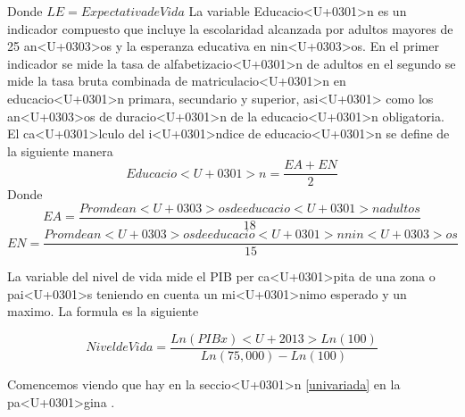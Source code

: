 \documentclass{article}
\begin{document}
Donde $LE = Expectativa de Vida$
La variable Educacio<U+0301>n es un indicador compuesto que incluye la escolaridad alcanzada por adultos mayores de 25 an<U+0303>os y la esperanza educativa en nin<U+0303>os. En el primer indicador se mide la tasa de alfabetizacio<U+0301>n de adultos en el segundo se mide la tasa bruta combinada de matriculacio<U+0301>n en educacio<U+0301>n primara, secundario y superior, asi<U+0301> como los an<U+0303>os de duracio<U+0301>n de la educacio<U+0301>n obligatoria. El ca<U+0301>lculo del i<U+0301>ndice de educacio<U+0301>n se define de la siguiente manera
\[Educacio<U+0301>n= \frac{EA + EN} {2} \]
Donde
\[EA= \frac{Prom de an<U+0303>os de educacio<U+0301>n adultos} {18}  \]
\[EN= \frac{Prom de an<U+0303>os de educacio<U+0301>n nin<U+0303>os} {15}  \]

La variable del nivel de vida mide el PIB per ca<U+0301>pita de una zona o pai<U+0301>s teniendo en cuenta un mi<U+0301>nimo esperado y un maximo. La formula es la siguiente

\[Nivel de Vida = \frac {Ln(PIBx) <U+2013> Ln (100)} {Ln(75,000)-Ln(100)} \]





Comencemos viendo que hay en la seccio<U+0301>n \ref{univariada} en la pa<U+0301>gina \pageref{univariada}.

\clearpage







%
%
\end{document}
